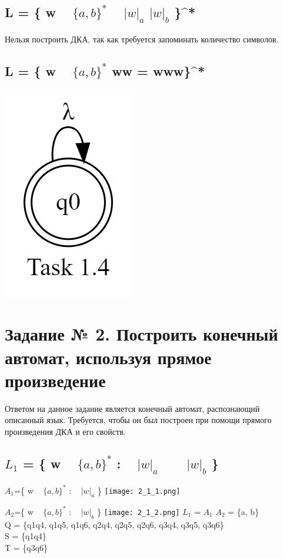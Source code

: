 \documentclass{article}
\begin{document}
\subsection{L = \{ w \in ~  $\{a, b\}^*$ \mid ~ $|w|_{a}$ \neq $|w|_{b}$ \}^*}
Нельзя построить ДКА, так как требуется запоминать количество символов.

\subsection{L = \{ w \in ~  $\{a, b\}^*$ \mid  ww = www\}^*}
\includegraphics[scale=0.3]{1_4.png}

\section{Задание № 2. Построить конечный автомат, используя прямое произведение}
Ответом на данное задание является конечный автомат, распознающий описанный язык. Требуется, чтобы он был построен при помощи прямого произведения ДКА и его свойств.

\subsection{$L_{1}$ = \{ w \in ~  $\{a, b\}^*$ :  ~ $|w|_{a}$  ~ \wedge ~  $|w|_{b}$ \}}
$A_{1}$=\{ w \in ~  $\{a, b\}^*$ :  ~ $|w|_{a}$  \}
\newline\texttt{[image: 2\_1\_1.png]}

\newline$A_{2}$=\{ w \in ~  $\{a, b\}^*$ :  ~ $|w|_{b}$  \}
\newline\texttt{[image: 2\_1\_2.png]}
\newline$L_{1}$ = $A_{1}$	\times $A_{2}$ 
\sum = \{a, b\}
\\Q = \{q1q4, q1q5, q1q6, q2q4, q2q5, q2q6, q3q4, q3q5, q3q6\}
\\S = \{q1q4\}
\\T = \{q3q6\}
\end{document}
